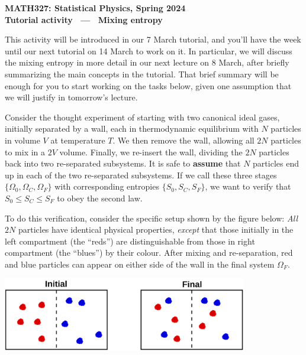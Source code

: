 \documentclass[12 pt]{article} %
\newcommand{\Om}{\ensuremath{\Omega} }
\begin{document}
\newcommand{\thisunit}{MATH327 Tutorial (Mixing)}
\newcommand{\moddate}{Last modified 7 Mar.~2024}
\begin{center}
  {\Large \textbf{MATH327: Statistical Physics, Spring 2024}} \\[12 pt]
  {\Large \textbf{Tutorial activity \ --- \ Mixing entropy}} \\[24 pt]
\end{center}

This activity will be introduced in our 7 March tutorial, and you'll have the week until our next tutorial on 14 March to work on it.
In particular, we will discuss the mixing entropy in more detail in our next lecture on 8 March, after briefly summarizing the main concepts in the tutorial.
That brief summary will be enough for you to start working on the tasks below, given one assumption that we will justify in tomorrow's lecture.

Consider the thought experiment of starting with two canonical ideal gases, initially separated by a wall, each in thermodynamic equilibrium with $N$ particles in volume $V$ at temperature $T$.
We then remove the wall, allowing all $2N$ particles to mix in a $2V$ volume. %
Finally, we re-insert the wall, dividing the $2N$ particles back into two re-separated subsystems.
It is safe to \textbf{assume} that $N$ particles end up in each of the two re-separated subsystems.
If we call these three stages $\{\Om_0, \Om_C, \Om_F\}$ with corresponding entropies $\{S_0, S_C, S_F\}$, we want to verify that $S_0 \leq S_C \leq S_F$ to obey the second law.

To do this verification, consider the specific setup shown by the figure below: \textit{All} $2N$ particles have identical physical properties, \textit{except} that those initially in the left compartment (the ``reds'') are distinguishable from those in right compartment (the ``blues'') by their colour.
After mixing and re-separation, red and blue particles can appear on either side of the wall in the final system $\Om_F$.

\begin{center}\includegraphics[width=0.8\textwidth]{figs/mix.pdf}\end{center}
\end{document}
